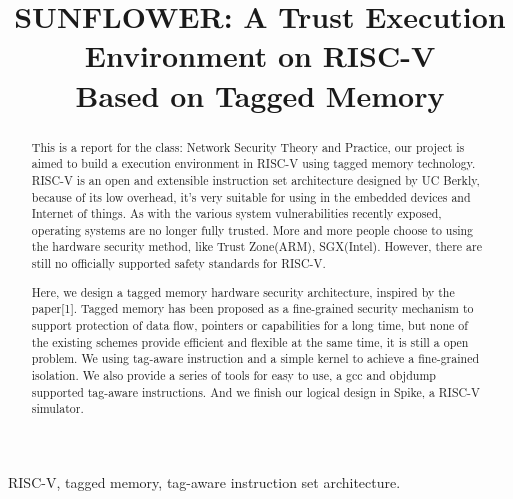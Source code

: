 \documentclass[conference]{IEEEtran}
\begin{document}
\title{\LARGE SUNFLOWER: A Trust Execution Environment on RISC-V \\Based on Tagged Memory}
\author{ }

\maketitle
\setlength{\parskip}{0.4\baselineskip}



\begin{abstract}
This is a report for the class: Network Security Theory and Practice, our project is aimed to build a execution environment in RISC-V using tagged memory technology. RISC-V is an open and extensible instruction set architecture designed by UC Berkly, because of its low overhead, it's very suitable for using in the embedded devices and Internet of things. As with the various system vulnerabilities recently exposed, operating systems are no longer fully trusted. More and more people choose to using the hardware security method, like Trust Zone(ARM), SGX(Intel). However, there are still no officially supported safety standards for RISC-V.

Here, we design a tagged memory hardware security architecture, inspired by the paper[1]. Tagged memory has been proposed as a fine-grained security mechanism to support protection of data flow, pointers or capabilities for a long time, but none of the existing schemes provide efficient and flexible at the same time, it is still a open problem. We using tag-aware instruction and a simple kernel to achieve a fine-grained isolation. We also provide a series of tools for easy to use, a gcc and objdump supported tag-aware instructions. And we finish our logical design in Spike, a RISC-V simulator.
\end{abstract}

\begin{keywords}
RISC-V, tagged memory, tag-aware instruction set architecture.\\
\end{keywords}


\end{document}
